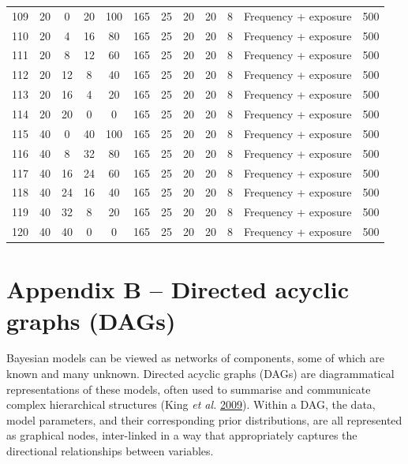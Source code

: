 \documentclass[
]{article}
\begin{document}
\begin{table}[H]
\begin{tabular}{cccccccccccc}
\rowcolor{gray!6}  109 & 20 & 0 & 20 & 100 & 165 & 25 & 20 & 20 & 8 & Frequency + exposure & 500\\
110 & 20 & 4 & 16 & 80 & 165 & 25 & 20 & 20 & 8 & Frequency + exposure & 500\\
\rowcolor{gray!6}  111 & 20 & 8 & 12 & 60 & 165 & 25 & 20 & 20 & 8 & Frequency + exposure & 500\\
112 & 20 & 12 & 8 & 40 & 165 & 25 & 20 & 20 & 8 & Frequency + exposure & 500\\
\rowcolor{gray!6}  113 & 20 & 16 & 4 & 20 & 165 & 25 & 20 & 20 & 8 & Frequency + exposure & 500\\
114 & 20 & 20 & 0 & 0 & 165 & 25 & 20 & 20 & 8 & Frequency + exposure & 500\\
\rowcolor{gray!6}  115 & 40 & 0 & 40 & 100 & 165 & 25 & 20 & 20 & 8 & Frequency + exposure & 500\\
116 & 40 & 8 & 32 & 80 & 165 & 25 & 20 & 20 & 8 & Frequency + exposure & 500\\
\rowcolor{gray!6}  117 & 40 & 16 & 24 & 60 & 165 & 25 & 20 & 20 & 8 & Frequency + exposure & 500\\
118 & 40 & 24 & 16 & 40 & 165 & 25 & 20 & 20 & 8 & Frequency + exposure & 500\\
\rowcolor{gray!6}  119 & 40 & 32 & 8 & 20 & 165 & 25 & 20 & 20 & 8 & Frequency + exposure & 500\\
120 & 40 & 40 & 0 & 0 & 165 & 25 & 20 & 20 & 8 & Frequency + exposure & 500\\
\bottomrule
\end{tabular}
\end{table}

\pagebreak

\hypertarget{appendix-b-directed-acyclic-graphs-dags}{%
\section{Appendix B -- Directed acyclic graphs (DAGs)}\label{appendix-b-directed-acyclic-graphs-dags}}

\hypertarget{appendixb}{}

Bayesian models can be viewed as networks of components, some of which are known and many unknown. Directed acyclic graphs (DAGs) are diagrammatical representations of these models, often used to summarise and communicate complex hierarchical structures (King \emph{et al.} \protect\hyperlink{ref-King2009}{2009}). Within a DAG, the data, model parameters, and their corresponding prior distributions, are all represented as graphical nodes, inter-linked in a way that appropriately captures the directional relationships between variables.
\end{document}
